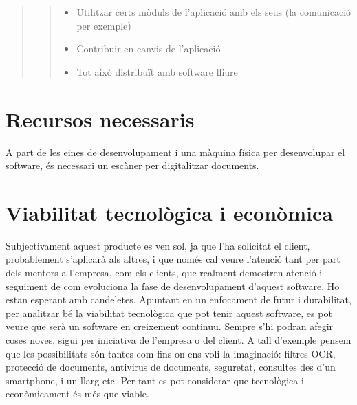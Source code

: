 \documentclass[letterpaper,11pt,catalan]{sphinxmanual}
\begin{document}
\begin{quote}
\begin{quote}
\begin{itemize}
\item {} 
Utilitzar certs mòduls de l'aplicació  amb els seus (la comunicació per exemple)

\item {} 
Contribuir en canvis de l'aplicació

\item {} 
Tot això distribuït amb software lliure

\end{itemize}
\end{quote}
\end{quote}


\section{Recursos necessaris}
\label{\detokenize{index:recursos-necessaris}}
A part de les eines de desenvolupament i una màquina física per desenvolupar el software,
és necessari un escàner per digitalitzar documents.


\section{Viabilitat tecnològica i econòmica}
\label{\detokenize{index:viabilitat-tecnologica-i-economica}}
Subjectivament aquest producte es ven sol, ja que l'ha solicitat el client, probablement
s'aplicarà als altres, i que només cal veure l'atenció tant per part dels
mentors a l'empresa, com els clients, que realment demostren atenció i seguiment
de com evoluciona la fase de desenvolupament d'aquest software. \sphinxquotedblleft{}Ho estan esperant
amb candeletes\sphinxquotedblright{}. Apuntant en un enfocament de futur i durabilitat, per analitzar bé la viabilitat
tecnològica que pot tenir aquest software, es pot veure que serà un software en creixement
continuu. Sempre s'hi podran afegir coses noves, sigui per iniciativa de l'empresa o del client.
A tall d'exemple pensem que les possibilitats són tantes com fins on ens voli la imaginació: filtres
OCR, protecció de documents, antivirus de documents, seguretat, consultes des d'un smartphone, i un llarg etc.
Per tant es pot considerar que tecnològica i econòmicament és més que viable.
\end{document}
